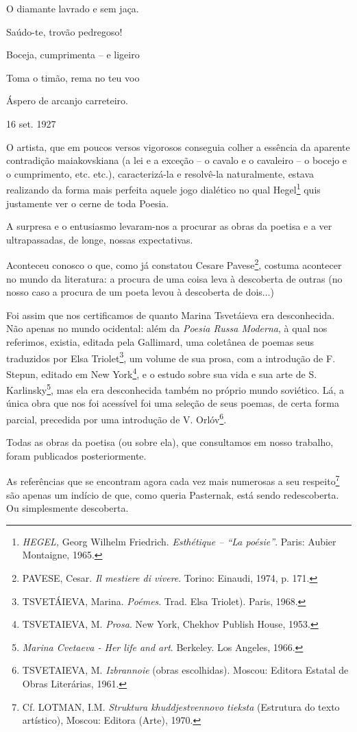 O diamante lavrado e sem jaça.

Saúdo-te, trovão pedregoso!

Boceja, cumprimenta -- e ligeiro

Toma o timão, rema no teu voo

Áspero de arcanjo carreteiro.

16 set. 1927

O artista, que em poucos versos vigorosos conseguia colher a essência da
aparente contradição maiakovskiana (a lei e a exceção -- o cavalo e o
cavaleiro -- o bocejo e o cumprimento, etc. etc.), caracterizá-la e
resolvê-la naturalmente, estava realizando da forma mais perfeita aquele
jogo dialético no qual Hegel\footnote{\emph{HEGEL,} Georg Wilhelm
  Friedrich. \emph{Esthétique -- ``La poésie''}. Paris: Aubier
  Montaigne, 1965.} quis justamente ver o cerne de toda Poesia.

A surpresa e o entusiasmo levaram-nos a procurar as obras da poetisa e a
ver ultrapassadas, de longe, nossas expectativas.

Aconteceu conosco o que, como já constatou Cesare Pavese\footnote{PAVESE,
  Cesar. \emph{Il mestiere di vivere}. Torino: Einaudi, 1974, p. 171.},
costuma acontecer no mundo da literatura: a procura de uma coisa leva à
descoberta de outras (no nosso caso a procura de um poeta levou à
descoberta de dois...)

Foi assim que nos certificamos de quanto Marina Tsvetáieva era
desconhecida. Não apenas no mundo ocidental: além da \emph{Poesia Russa
Moderna}, à qual nos referimos, existia, editada pela Gallimard, uma
coletânea de poemas seus traduzidos por Elsa Triolet\footnote{TSVETÁIEVA,
  Marina. \emph{Poémes}. Trad. Elsa Triolet). Paris, 1968.}, um volume
de sua prosa, com a introdução de F. Stepun, editado em New
York\footnote{TSVETAIEVA, M. \emph{Prosa}. New York, Chekhov Publish
  House, 1953.}, e o estudo sobre sua vida e sua arte de S.
Karlinsky\footnote{\emph{Marina Cvetaeva - Her life and art}. Berkeley.
  Los Angeles, 1966.}, mas ela era desconhecida também no próprio mundo
soviético. Lá, a única obra que nos foi acessível foi uma seleção de
seus poemas, de certa forma parcial, precedida por uma introdução de V.
Orlóv\footnote{TSVETAIEVA, M. \emph{Izbrannoie} (obras escolhidas).
  Moscou: Editora Estatal de Obras Literárias, 1961.}.

Todas as obras da poetisa (ou sobre ela), que consultamos em nosso
trabalho, foram publicados posteriormente.

As referências que se encontram agora cada vez mais numerosas a seu
respeito\footnote{Cf. LOTMAN, I.M. \emph{Struktura khuddjestvennovo
  tieksta} (Estrutura do texto artístico), Moscou: Editora (Arte), 1970.}
são apenas um indício de que, como queria Pasternak, está sendo
redescoberta. Ou simplesmente descoberta.

